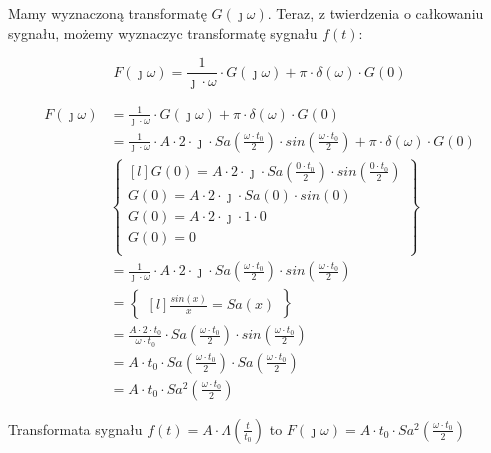 \begin{task}
Mamy wyznaczoną transformatę $G(\jmath \omega)$. Teraz, z twierdzenia o całkowaniu sygnału, możemy wyznaczyc transformatę sygnału $f(t)$:

\begin{equation}
F(\jmath \omega) = \frac{1}{\jmath \cdot \omega} \cdot G(\jmath \omega) + \pi \cdot \delta(\omega) \cdot G(0)
\end{equation}

\begin{align*}
F(\jmath \omega)&= \frac{1}{\jmath \cdot \omega} \cdot G(\jmath \omega) + \pi \cdot \delta(\omega) \cdot G(0)\\
&=\frac{1}{\jmath \cdot \omega} \cdot A \cdot 2 \cdot \jmath \cdot Sa\left(\frac{\omega \cdot t_{0}}{2}\right) \cdot sin\left(\frac{\omega \cdot t_{0}}{2}\right)+ \pi \cdot \delta(\omega) \cdot G(0)\\
&\begin{Bmatrix*}[l]
G(0)=A \cdot 2 \cdot \jmath \cdot Sa\left(\frac{0 \cdot t_{0}}{2}\right) \cdot sin\left(\frac{0 \cdot t_{0}}{2}\right)\\
G(0)=A \cdot 2 \cdot \jmath \cdot Sa(0) \cdot sin(0)\\
G(0)=A \cdot 2 \cdot \jmath \cdot 1 \cdot 0\\
G(0)=0\\
\end{Bmatrix*}\\
&=\frac{1}{\jmath \cdot \omega} \cdot A \cdot 2 \cdot \jmath \cdot Sa\left(\frac{\omega \cdot t_{0}}{2}\right) \cdot sin\left(\frac{\omega \cdot t_{0}}{2}\right)\\
&=\begin{Bmatrix*}[l]
\frac{sin(x)}{x}=Sa(x)
\end{Bmatrix*}\\
&=\frac{A \cdot 2 \cdot t_{0}}{\omega \cdot t_{0}} \cdot Sa\left(\frac{\omega \cdot t_{0}}{2}\right) \cdot sin\left(\frac{\omega \cdot t_{0}}{2}\right)\\
&=A \cdot t_{0} \cdot Sa\left(\frac{\omega \cdot t_{0}}{2}\right) \cdot Sa\left(\frac{\omega \cdot t_{0}}{2}\right)\\
&= A \cdot t_{0} \cdot Sa^{2}(\frac{\omega \cdot t_{0}}{2})
\end{align*}


Transformata sygnału $f(t) = A \cdot \Lambda(\frac{t}{t_{0}})$ to $F(\jmath \omega)=A \cdot t_{0} \cdot Sa^{2}(\frac{\omega \cdot t_{0}}{2})$

\end{task}
